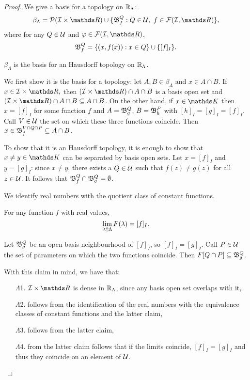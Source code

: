 \documentclass[draft.tex]{subfiles}
\begin{document}
\begin{proof}
We give a basis for a topology on $\mathbb{R}_{\Lambda}$:
\begin{equation*}
    \beta_{\Lambda} = \powerset{\cl{I} \times \RR} \cup \{\fk{B}^{Q}_{f}: Q \in \cl{U}, \ f \in \cl{F}(\cl{I}, \RR)\},
\end{equation*}
where for any $Q \in \mathcal{U}$ and $\varphi \in \cl{F}(\cl{I}, \RR)$,
\begin{equation*}
    \mathfrak{B}^{Q}_{f} = \{(x, f(x)): x \in Q\} \cup \{[f]_{I}\}.
\end{equation*}
\begin{claim}
$\beta_{\Lambda}$ is the basis for an Hausdorff topology on $\mathbb{R}_{\Lambda}$.
\end{claim}
We first show it is the basis for a topology: let $A, B \in \beta_{\Lambda}$ and $x \in A \cap B$. If $x \in \cl{I} \times \RR,$ then $(\cl{I} \times \RR) \cap A \cap B$ is a basis open set and $(\cl{I} \times \RR) \cap A \cap B \subseteq A \cap B$. On the other hand, if $x \in \struct{K}$ then $x = [f]_I$ for some function $f$ and $A = \mathfrak{B}^{Q}_{g}$, $B = \mathfrak{B}^{P}_{h}$ with $[h]_I = [g]_I = [f]_I$. Call $V \in \mathcal{U}$ the set on which these three functions coincide. Then $x \in \mathfrak{B}^{V \cap Q \cap P}_{f} \subseteq A \cap B$.
\par To show that it is an Hausdorff topology, it is enough to show that $x \neq y \in \struct{K}$ can be separated by basis open sets. Let $x = [f]_I$ and $y = [g]_I$: since $x \neq y$, there exists a $Q \in \mathcal{U}$ such that $f(z) \neq g(z)$ for all $z \in \mathcal{U}$. It follows that $\mathfrak{B}^{Q}_{f} \cap \mathfrak{B}^{Q}_{g} = \emptyset$. 
\par We identify real numbers with the quotient class of constant functions.
\begin{claim}
For any function $f$ with real values,
\begin{equation*}
    \lim\limits_{\lambda \uparrow \Lambda}{F(\lambda)} = [f]_I.
\end{equation*}
\end{claim}
Let $\mathfrak{B}^{Q}_{g}$ be an open basis neighbourhood of $[f]_I$, so $[f]_I = [g]_I$. Call $P \in \mathcal{U}$ the set of parameters on which the two functions coincide. Then $F[Q \cap P] \subseteq \mathfrak{B}^{Q}_{g}$.
\par With this claim in mind, we have that:
\begin{itemize}
    \item[$\Lambda$1.] $\cl{I} \times \RR$ is dense in $\mathbb{R}_{\Lambda}$, since any basis open set overlaps with it,
    \item[$\Lambda$2.] follows from the identification of the real numbers with the equivalence classes of constant functions and the latter claim,
    \item[$\Lambda$3.] follows from the latter claim,
    \item[$\Lambda$4.] from the latter claim follows that if the limits coincide, $[f]_I = [g]_I$ and thus they coincide on an element of $\mathcal{U}$.
\end{itemize}
\end{proof}
\end{document}
